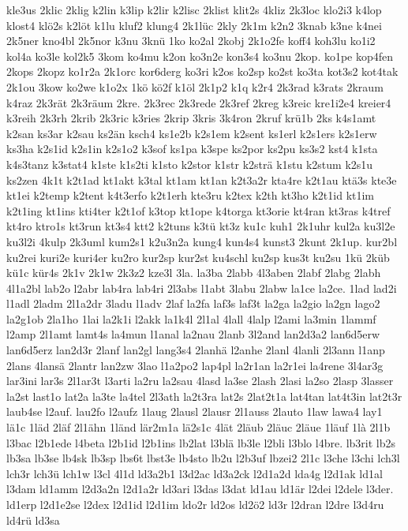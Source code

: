 {kle3us
2klic
2klig
k2lin
k3lip
k2lir
k2lisc
2klist
klit2s
4kliz
2k3loc
klo2i3
k4lop
klost4
klö2s
k2löt
k1lu
kluf2
klung4
2k1lüc
2kly
2k1m
k2n2
3knab
k3ne
k4nei
2k5ner
kno4bl
2k5nor
k3nu
3knü
1ko
ko2al
2kobj
2k1o2fe
koff4
koh3lu
ko1i2
kol4a
ko3le
kol2k5
3kom
ko4mu
k2on
ko3n2e
kon3s4
ko3nu
2kop.
ko1pe
kop4fen
2kops
2kopz
ko1r2a
2k1orc
kor6derg
ko3ri
k2os
ko2sp
ko2st
ko3ta
kot3s2
kot4tak
2k1ou
3kow
ko2we
k1o2x
1kö
kö2f
k1öl
2k1p2
k1q
k2r4
2k3rad
k3rats
2kraum
k4raz
2k3rät
2k3räum
2kre.
2k3rec
2k3rede
2k3ref
2kreg
k3reic
kre1i2e4
kreier4
k3reih
2k3rh
2krib
2k3ric
k3ries
2krip
3kris
3k4ron
2kruf
krü1b
2ks
k4s1amt
k2san
ks3ar
k2sau
ks2än
ksch4
ks1e2b
k2s1em
k2sent
ks1erl
k2s1ers
k2s1erw
ks3ha
k2s1id
k2s1in
k2s1o2
k3sof
ks1pa
k3spe
ks2por
ks2pu
ks3s2
kst4
k1sta
k4s3tanz
k3stat4
k1ste
k1s2ti
k1sto
k2stor
k1str
k2strä
k1stu
k2stum
k2s1u
ks2zen
4k1t
k2t1ad
kt1akt
k3tal
kt1am
kt1an
k2t3a2r
kta4re
k2t1au
ktä3s
kte3e
kt1ei
k2temp
k2tent
k4t3erfo
k2t1erh
kte3ru
k2tex
k2th
kt3ho
k2t1id
kt1im
k2t1ing
kt1ins
kti4ter
k2t1of
k3top
kt1ope
k4torga
kt3orie
kt4ran
kt3ras
k4tref
kt4ro
ktro1s
kt3run
kt3s4
ktt2
k2tuns
k3tü
kt3z
ku1c
kuh1
2k1uhr
kul2a
ku3l2e
ku3l2i
4kulp
2k3uml
kum2s1
k2u3n2a
kung4
kun4s4
kunst3
2kunt
2k1up.
kur2bl
ku2rei
kuri2e
kuri4er
ku2ro
kur2sp
kur2st
ku4schl
ku2sp
kus3t
ku2su
1kü
2küb
kü1c
kür4s
2k1v
2k1w
2k3z2
kze3l
3la.
la3ba
2labb
4l3aben
2labf
2labg
2labh
4l1a2bl
lab2o
l2abr
lab4ra
lab4ri
2l3abs
l1abt
3labu
2labw
la1ce
la2ce.
1lad
lad2i
l1adl
2ladm
2l1a2dr
3ladu
l1adv
2laf
la2fa
laf3s
laf3t
la2ga
la2gio
la2gn
lago2
la2g1ob
2la1ho
1lai
la2k1i
l2akk
la1k4l
2l1al
4lall
4lalp
l2ami
la3min
1lammf
l2amp
2l1amt
lamt4s
la4mun
l1anal
la2nau
2lanb
3l2and
lan2d3a2
lan6d5erw
lan6d5erz
lan2d3r
2lanf
lan2gl
lang3s4
2lanhä
l2anhe
2lanl
4lanli
2l3ann
l1anp
2lans
4lansä
2lantr
lan2zw
3lao
l1a2po2
lap4pl
la2r1an
la2r1ei
la4rene
3l4ar3g
lar3ini
lar3s
2l1ar3t
l3arti
la2ru
la2sau
4lasd
la3se
2lash
2lasi
la2so
2lasp
3lasser
la2st
last1o
lat2a
la3te
la4tel
2l3ath
la2t3ra
lat2s
2lat2t1a
lat4tan
lat4t3in
lat2t3r
laub4se
l2auf.
lau2fo
l2aufz
1laug
2lausl
2lausr
2l1auss
2lauto
1law
lawa4
lay1
lä1c
1läd
2läf
2l1ähn
1länd
lär2m1a
lä2s1c
4lät
2läub
2läuc
2läue
1läuf
1là
2l1b
l3bac
l2b1ede
l4beta
l2b1id
l2b1ins
lb2lat
l3blä
lb3le
l2bli
l3blo
l4bre.
lb3rit
lb2s
lb3sa
lb3se
lb4sk
lb3sp
lbs6t
lbst3e
lb4sto
lb2u
l2b3uf
lbzei2
2l1c
l3che
l3chi
lch3l
lch3r
lch3ü
lch1w
l3cl
4l1d
ld3a2b1
l3d2ac
ld3a2ck
l2d1a2d
lda4g
l2d1ak
ld1al
l3dam
ld1amm
l2d3a2n
l2d1a2r
ld3ari
l3das
l3dat
ld1au
ld1är
l2dei
l2dele
l3der.
ld1erp
l2d1e2se
l2dex
l2d1id
l2d1im
ldo2r
ld2os
ld2ö2
ld3r
l2dran
l2dre
l3d4ru
ld4rü
ld3sa
}

